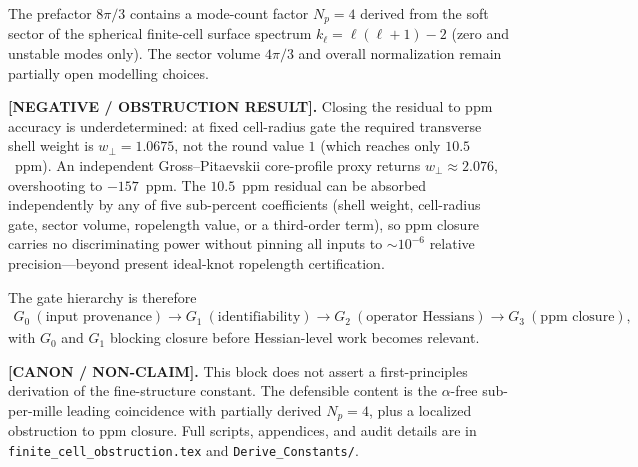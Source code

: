 \documentclass[11pt]{article}
\theoremstyle{definition}
\theoremstyle{plain}
\theoremstyle{remark}
\begin{document}
            The prefactor $8\pi/3$ contains a mode-count factor $N_p=4$ derived from the
            soft sector of the spherical finite-cell surface spectrum
            $k_\ell=\ell(\ell+1)-2$ (zero and unstable modes only). The sector volume
            $4\pi/3$ and overall normalization remain partially open modelling choices.

            \textbf{[NEGATIVE / OBSTRUCTION RESULT].}
            Closing the residual to ppm accuracy is underdetermined: at fixed cell-radius
            gate the required transverse shell weight is $w_\perp=1.0675$, not the round
            value $1$ (which reaches only $10.5$~ppm). An independent Gross--Pitaevskii
            core-profile proxy returns $w_\perp\approx 2.076$, overshooting to $-157$~ppm.
            The $10.5$~ppm residual can be absorbed independently by any of five
            sub-percent coefficients (shell weight, cell-radius gate, sector volume,
            ropelength value, or a third-order term), so ppm closure carries no
            discriminating power without pinning all inputs to $\sim10^{-6}$ relative
            precision---beyond present ideal-knot ropelength certification.

            The gate hierarchy is therefore
            \begin{align}
                G_0\ (\text{input provenance})
                \longrightarrow
                G_1\ (\text{identifiability})
                \longrightarrow
                G_2\ (\text{operator Hessians})
                \longrightarrow
                G_3\ (\text{ppm closure}),
                \label{eq:finite_cell_gate_hierarchy}
            \end{align}
            with $G_0$ and $G_1$ blocking closure before Hessian-level work becomes relevant.

            \textbf{[CANON / NON-CLAIM].}
            This block does not assert a first-principles derivation of the fine-structure
            constant. The defensible content is the $\alpha$-free sub-per-mille leading
            coincidence with partially derived $N_p=4$, plus a localized obstruction to
            ppm closure. Full scripts, appendices, and audit details are in
            \texttt{finite\_cell\_obstruction.tex} and \texttt{Derive\_Constants/}.
\end{document}
